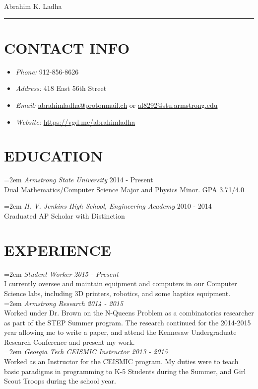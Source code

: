 \documentclass[11pt]{article} %
\begin{document}
{\huge Abrahim K. Ladha}\\
\hrule
\section*{CONTACT INFO}
\begin{itemize}
  \setlength{\itemsep}{1pt}
  \setlength{\parskip}{0pt}
  \setlength{\parsep}{0pt}
\item \emph{Phone:} 912-856-8626
\item \emph{Address:} 418 East 56th Street
\item \emph{Email:}  \href{mailto:abrahimladha@protonmail.ch}{abrahimladha@protonmail.ch} or \href{mailto:al8292@stu.armstrong.edu}{al8292@stu.armstrong.edu}%
\item \emph{Website:}  \url{https://vgd.me/abrahimladha} %
\end{itemize}
\section*{EDUCATION}
\hangindent=2em
\emph{Armstrong State University} 2014 - Present\\
Dual Mathematics/Computer Science Major and Physics Minor. GPA 3.71/4.0

\hangindent=2em
\emph{H. V. Jenkins High School, Engineering Academy} 2010 - 2014\\
Graduated AP Scholar with Distinction
\section*{EXPERIENCE}
\hangindent=2em
\emph{Student Worker 2015 - Present}\\
I currently oversee and maintain equipment and computers in our Computer Science labs, including 3D printers, robotics, and some haptics equipment. \\

\hangindent=2em
\emph{Armstrong Research 2014 - 2015}\\
Worked under Dr. Brown on the N-Queens Problem as a combinatorics researcher as part of the STEP Summer program. The research continued for the 2014-2015 year allowing me to write a paper, and attend the Kennesaw Undergraduate Research Conference and present my work. \\

\hangindent=2em
\emph{Georgia Tech CEISMIC Instructor 2013 - 2015}\\
Worked as an Instructor for the CEISMIC program. My duties were to teach basic paradigms in programming to K-5 Students during the Summer, and Girl Scout Troops during the school year.
\end{document}
